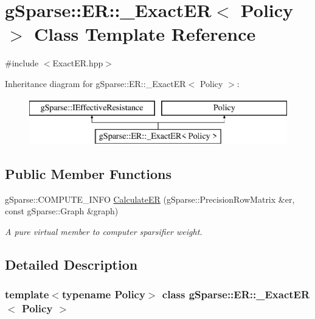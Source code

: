 \hypertarget{classg_sparse_1_1_e_r_1_1___exact_e_r}{}\section{g\+Sparse\+:\+:ER\+:\+:\+\_\+\+Exact\+ER$<$ Policy $>$ Class Template Reference}
\label{classg_sparse_1_1_e_r_1_1___exact_e_r}


{\ttfamily \#include $<$Exact\+E\+R.\+hpp$>$}

Inheritance diagram for g\+Sparse\+:\+:ER\+:\+:\+\_\+\+Exact\+ER$<$ Policy $>$\+:\begin{figure}[H]
\begin{center}
\leavevmode
\includegraphics[height=2.000000cm]{classg_sparse_1_1_e_r_1_1___exact_e_r}
\end{center}
\end{figure}
\subsection*{Public Member Functions}
\begin{DoxyCompactItemize}
\item 
\mbox{\label{classg_sparse_1_1_e_r_1_1___exact_e_r_a47b950a81c815626a9d51a6284d1d49d}} 
g\+Sparse\+::\+C\+O\+M\+P\+U\+T\+E\+\_\+\+I\+N\+FO \mbox{\hyperlink{classg_sparse_1_1_e_r_1_1___exact_e_r_a47b950a81c815626a9d51a6284d1d49d}{Calculate\+ER}} (g\+Sparse\+::\+Precision\+Row\+Matrix \&er, const g\+Sparse\+::\+Graph \&graph)
\begin{DoxyCompactList}\small\item\em A pure virtual member to computer sparsifier weight. \end{DoxyCompactList}\end{DoxyCompactItemize}


\subsection{Detailed Description}
\subsubsection*{template$<$typename Policy$>$\newline
class g\+Sparse\+::\+E\+R\+::\+\_\+\+Exact\+E\+R$<$ Policy $>$}

